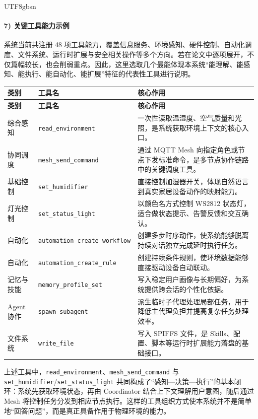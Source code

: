 \documentclass[a4paper,12pt]{article}
\begin{document}
\begin{CJK*}{UTF8}{gbsn}
\paragraph{7) 关键工具能力示例}
系统当前共注册 48 项工具能力，覆盖信息服务、环境感知、硬件控制、自动化调度、文件系统、运行时扩展与安全相关操作等多个方向。若在论文中逐项展开，不仅篇幅较长，也会削弱重点。因此，这里选取几个最能体现本系统“能理解、能感知、能执行、能自动化、能扩展”特征的代表性工具进行说明。

\begin{longtable}{p{2.8cm}p{3.8cm}p{7.8cm}}
\toprule
\textbf{类别} & \textbf{工具名} & \textbf{核心作用} \\
\midrule
\endfirsthead
\toprule
\textbf{类别} & \textbf{工具名} & \textbf{核心作用} \\
\midrule
\endhead
综合感知 & \texttt{read\_environment} & 一次性读取温湿度、空气质量和光照，是系统获取环境上下文的核心入口。 \\
协同调度 & \texttt{mesh\_send\_command} & 通过 MQTT Mesh 向指定角色或节点下发标准命令，是多节点协作链路中的关键调度工具。 \\
基础控制 & \texttt{set\_humidifier} & 直接控制加湿器开关，体现自然语言到真实家居设备动作的映射能力。 \\
灯光控制 & \texttt{set\_status\_light} & 以颜色名方式控制 WS2812 状态灯，适合做状态提示、告警反馈和交互确认。 \\
自动化 & \texttt{automation\_create\_workflow} & 创建多步时序动作，使系统能够脱离持续对话独立完成延时执行任务。 \\
自动化 & \texttt{automation\_create\_rule} & 创建持续条件规则，使环境数据能够直接驱动设备自动联动。 \\
记忆与技能 & \texttt{memory\_profile\_set} & 写入稳定用户画像与长期偏好，为系统提供跨会话的个性化依据。 \\
Agent 协作 & \texttt{spawn\_subagent} & 派生临时子代理处理局部任务，用于降低主代理负担并提高复杂任务处理效率。 \\
文件系统 & \texttt{write\_file} & 写入 SPIFFS 文件，是 Skills、配置、脚本等运行时扩展能力落盘的基础接口。 \\
\bottomrule
\end{longtable}

上述工具中，\texttt{read\_environment}、\texttt{mesh\_send\_command} 与 \texttt{set\_humidifier}/\texttt{set\_status\_light} 共同构成了“感知---决策---执行”的基本闭环：系统先获取环境状态，再由 Coordinator 结合上下文理解用户意图，随后通过 Mesh 将控制任务分发到相应节点执行。这样的工具组织方式使本系统并不是简单地“回答问题”，而是真正具备作用于物理环境的能力。


\end{CJK*}
\end{document}
